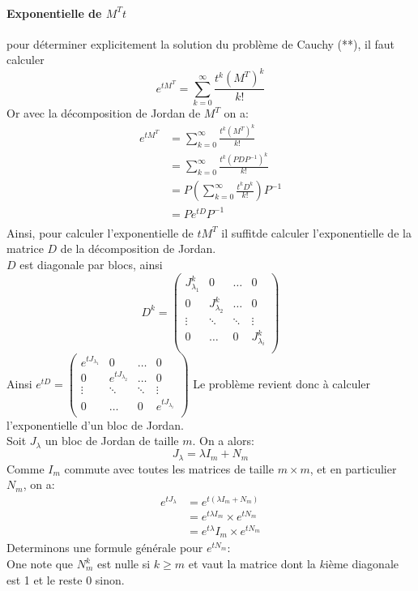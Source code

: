 \documentclass[a4paper]{article}
\theoremstyle{plain}
\theoremstyle{definition}
\theoremstyle{remark}
\begin{document}
\paragraph{Exponentielle de $M^Tt$}
pour déterminer explicitement la solution du problème de Cauchy (**), il faut calculer $$e^{tM^T}=\sum_{k=0}^{\infty}\frac{t^k (M^T)^k}{k!}$$
Or avec la décomposition de Jordan de $M^T$ on a:
\begin{align*}
    e^{tM^T}&=\sum_{k=0}^{\infty}\frac{t^k(M^T)^k}{k!}\\
    &=\sum_{k=0}^{\infty}\frac{t^k(PDP^{-1})^k}{k!}\\
    &=P\left(\sum_{k=0}^{\infty}\frac{t^kD^k}{k!}\right)P^{-1}\\
    &=Pe^{tD}P^{-1}\\
\end{align*}
Ainsi, pour calculer l'exponentielle de $tM^T$ il suffitde calculer l'exponentielle de la matrice $D$ de la décomposition de Jordan.\\
$D$ est diagonale par blocs, ainsi 
$$
D^k=\begin{pmatrix}
J_{\lambda_1}^k&0&\hdots&0\\
0&J_{\lambda_2}^k&\hdots&0\\
\vdots&\ddots&\ddots&\vdots\\
0&\hdots&0&J_{\lambda_i}^k\\
\end{pmatrix}
$$
Ainsi $e^{tD}=\begin{pmatrix}
e^{tJ_{\lambda_1}}&0&\hdots&0\\
0&e^{tJ_{\lambda_2}}&\hdots&0\\
\vdots&\ddots&\ddots&\vdots\\
0&\hdots&0&e^{tJ_{\lambda_i}}\\
\end{pmatrix}$ 
Le problème revient donc à calculer l'exponentielle d'un bloc de Jordan.\\
Soit $J_\lambda$ un bloc de Jordan de taille $m$. On a alors:
$$J_\lambda=\lambda I_m+N_m$$
Comme $I_m$ commute avec toutes les matrices de taille $m \times m$, et en particulier $N_m$, on a:
\begin{align*}
    e^{tJ_\lambda}&=e^{t\left(\lambda I_m+N_m\right)}\\
    &=e^{t\lambda I_m}\times e^{tN_m}\\
    &=e^{t\lambda}I_m\times e^{tN_m}
\end{align*}
Determinons une formule générale pour $e^{tN_m}$:\\
One note que $N_m^k$ est nulle si $k\geqslant m$ et vaut la matrice dont la $k$ième diagonale est 1 et le reste 0 sinon.
\end{document}
